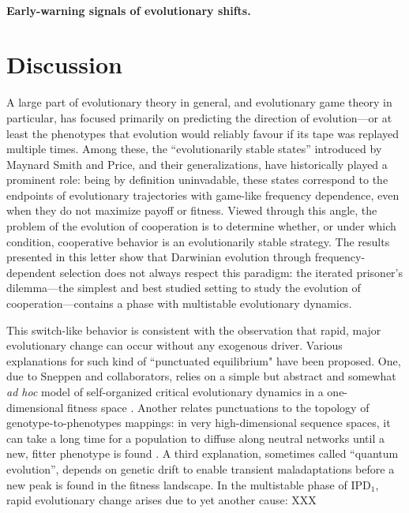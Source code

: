 \documentclass[12pt]{article}
\def\IPD{\textrm{IPD}}
\def\IPD1{\textrm{IPD}_1}
\begin{document}
\paragraph*{Early-warning signals of evolutionary shifts.}

\section*{Discussion}

A large part of evolutionary theory in general, and evolutionary game theory in particular, has focused primarily on predicting the direction of evolution---or at least the phenotypes that evolution would reliably favour if its tape was replayed multiple times. Among these, the ``evolutionarily stable states'' introduced by Maynard Smith and Price, and their generalizations, have historically played a prominent role: being by definition uninvadable, these states correspond to the endpoints of evolutionary trajectories with game-like frequency dependence, even when they do not maximize payoff or fitness. Viewed through this angle, the problem of the evolution of cooperation is to determine whether, or under which condition, cooperative behavior is an evolutionarily stable strategy. The results presented in this letter show that Darwinian evolution through frequency-dependent selection does not always respect this paradigm: the iterated prisoner's dilemma---the simplest and best studied setting to study the evolution of cooperation---contains a phase with multistable evolutionary dynamics. 

This switch-like behavior is consistent with the observation that rapid, major evolutionary change can occur without any exogenous driver. Various explanations for such kind of ``punctuated equilibrium" have been proposed. One, due to Sneppen and collaborators, relies on a simple but abstract and somewhat \emph{ad hoc} model of self-organized critical evolutionary dynamics in a one-dimensional fitness space \cite{sneppen_evolution_1995}. Another relates punctuations to the topology of genotype-to-phenotypes mappings: in very high-dimensional sequence spaces, it can take a long time for a population to diffuse along neutral networks until a new, fitter phenotype is found \cite{fontana_continuity_1998, crutchfield_evolutionary_2002,bakhtin_evolution_2021}. A third explanation, sometimes called ``quantum evolution'', depends on genetic drift to enable transient maladaptations before a new peak is found in the fitness landscape. In the multistable phase of $\IPD1$, rapid evolutionary change arises due to yet another cause: XXX 
\end{document}
